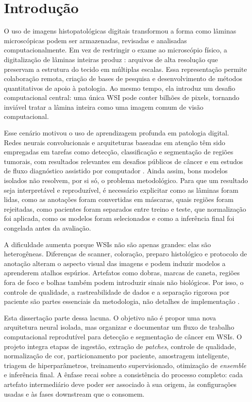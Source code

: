 \chapter{Introdução}\label{chp:Introducao}

O uso de imagens histopatológicas digitais transformou a forma como lâminas
microscópicas podem ser armazenadas, revisadas e analisadas computacionalmente.
Em vez de restringir o exame ao microscópio físico, a digitalização de lâminas
inteiras produz : arquivos de alta
resolução que preservam a estrutura do tecido em múltiplas escalas. Essa
representação permite colaboração remota, criação de bases de pesquisa e
desenvolvimento de métodos quantitativos de apoio à patologia. Ao mesmo tempo,
ela introduz um desafio computacional central: uma única WSI pode conter bilhões
de pixels, tornando inviável tratar a lâmina inteira como uma imagem comum de
visão computacional.

Esse cenário motivou o uso de aprendizagem profunda em patologia digital. Redes
neurais convolucionais e arquiteturas baseadas em atenção têm sido empregadas em
tarefas como detecção, classificação e segmentação de regiões tumorais, com
resultados relevantes em desafios públicos de câncer e em estudos de fluxo
diagnóstico assistido por computador \cite{bejnordi2017diagnostic,bandi2019resolution,campanella2025clinical}. Ainda assim, bons modelos isolados não
resolvem, por si só, o problema metodológico. Para que um resultado seja
interpretável e reproduzível, é necessário explicitar como as lâminas foram
lidas, como as anotações foram convertidas em máscaras, quais regiões foram
rejeitadas, como pacientes foram separados entre treino e teste, que
normalização foi aplicada, como os modelos foram selecionados e como a inferência
final foi congelada antes da avaliação.

A dificuldade aumenta porque WSIs não são apenas grandes: elas são heterogêneas.
Diferenças de scanner, coloração, preparo histológico e protocolo de anotação
alteram o aspecto visual das imagens e podem induzir modelos a aprenderem
atalhos espúrios. Artefatos como dobras, marcas de caneta, regiões fora de foco
e bolhas também podem introduzir sinais não biológicos. Por isso, o controle de
qualidade, a rastreabilidade de dados e a separação rigorosa por paciente são
partes essenciais da metodologia, não detalhes de implementação
\cite{weng2024grandqc,dawood2026confounding,wilkinson2016fair}.

Esta dissertação parte dessa lacuna. O objetivo não é propor uma nova arquitetura
neural isolada, mas organizar e documentar um fluxo de trabalho computacional
reprodutível para detecção e segmentação de câncer em WSIs. O projeto integra
etapas de ingestão, extração de \textit{patches}, controle de qualidade,
normalização de cor, particionamento por paciente, amostragem inteligente,
triagem de hiperparâmetros, treinamento supervisionado, otimização de
\textit{ensemble} e inferência final. A ênfase recai sobre a consistência do
processo completo: cada artefato intermediário deve poder ser associado à sua
origem, às configurações usadas e às fases downstream que o consomem.

